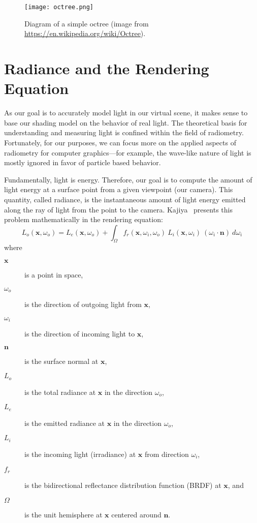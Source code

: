 \begin{figure}[h]
\centering
\texttt{[image: octree.png]}
\caption{Diagram of a simple octree (image from \url{https://en.wikipedia.org/wiki/Octree}).}
\label{fig:octree}
\end{figure}

\section{Radiance and the Rendering Equation}
As our goal is to accurately model light in our virtual scene, it makes sense to base our shading model on the behavior of real light. The theoretical basis for understanding and measuring light is confined within the field of radiometry. Fortunately, for our purposes, we can focus more on the applied aspects of radiometry for computer graphics---for example, the wave-like nature of light is mostly ignored in favor of particle based behavior.

Fundamentally, light is energy. Therefore, our goal is to compute the amount of light energy at a surface point from a given viewpoint (our camera). This quantity, called radiance, is the instantaneous amount of light energy emitted along the ray of light from the point to the camera. Kajiya~\cite{Kajiya:1986:RE:15886.15902} presents this problem mathematically in the rendering equation:
\begin{equation*}
    L_o(\bm{x}, \omega_o) = L_e(\bm{x}, \omega_o) + \int_\Omega f_r(\bm{x}, \omega_i, \omega_o)\ L_i(\bm{x}, \omega_i)\ (\omega_i \cdot \bm{n})\ d\omega_i
\end{equation*}
where
\begin{description}
    \item[$\bm{x}$] is a point in space,
    \item[$\omega_o$] is the direction of outgoing light from $\bm{x}$,
    \item[$\omega_i$] is the direction of incoming light to $\bm{x}$,
    \item[$\bm{n}$] is the surface normal at $\bm{x}$,
    \item[$L_o$] is the total radiance at $\bm{x}$ in the direction $\omega_o$,
    \item[$L_e$] is the emitted radiance at $\bm{x}$ in the direction $\omega_o$,
    \item[$L_i$] is the incoming light (irradiance) at $\bm{x}$ from direction $\omega_i$,
    \item[$f_r$] is the bidirectional reflectance distribution function (BRDF) at $\bm{x}$, and
    \item[$\Omega$] is the unit hemisphere at $\bm{x}$ centered around $\bm{n}$.
\end{description}

